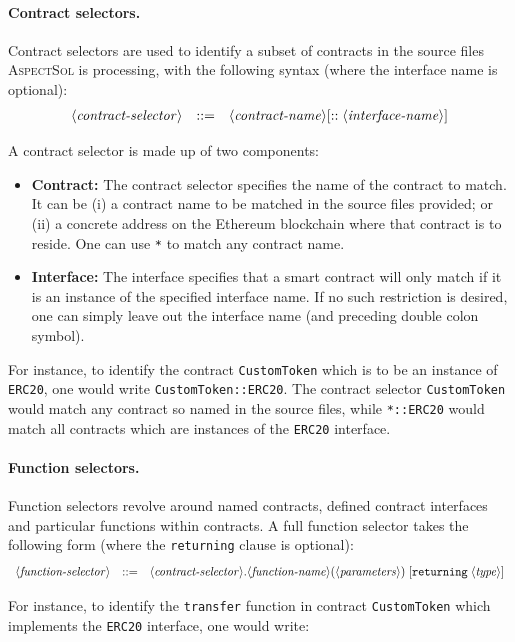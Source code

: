 \documentclass{article}
\newcommand{\AspectSol}{\textsc{AspectSol}\xspace}
\newcommand{\variable}[1]{\ensuremath{\langle\textrm{\textit{#1}}\rangle}}
\begin{document}
\paragraph{Contract selectors.}
Contract selectors are used to identify a subset of contracts in the source files \AspectSol is processing, with the following syntax (where the interface name is optional):
\[\begin{array}{lcl}
\variable{contract-selector} & ::= & \variable{contract-name}[::\variable{interface-name}]
\end{array}\]

A contract selector is made up of two components:
\begin{itemize}
    \item \textbf{Contract:} The contract selector specifies the name of the contract to match. It can be (i) a contract name to be matched in the source files provided; or (ii) a concrete address on the Ethereum blockchain where that contract is to reside. One can use \texttt{*} to match any contract name.
    \item \textbf{Interface:} The interface specifies that a smart contract will only match if it is an instance of the specified interface name. If no such restriction is desired, one can simply leave out the interface name (and preceding double colon symbol).
\end{itemize}

For instance, to identify the contract \texttt{CustomToken} which is to be an instance of \texttt{ERC20}, one would write \texttt{CustomToken::ERC20}. The contract selector \texttt{CustomToken} would match any contract so named in the source files, while \texttt{*::ERC20} would match all contracts which are instances of the \texttt{ERC20} interface.

\paragraph{Function selectors.}
Function selectors revolve around named contracts, defined contract interfaces and particular functions within contracts. A full function selector takes the following form (where the \texttt{returning} clause is optional):
\[\begin{array}{lcl}
\variable{function-selector} & ::= & \variable{contract-selector}.\variable{function-name}(\variable{parameters}) \;[\texttt{returning}\;\variable{type}]
\end{array}\]

For instance, to identify the \texttt{transfer} function in contract \texttt{CustomToken} which implements the \texttt{ERC20} interface, one would write:
\end{document}
